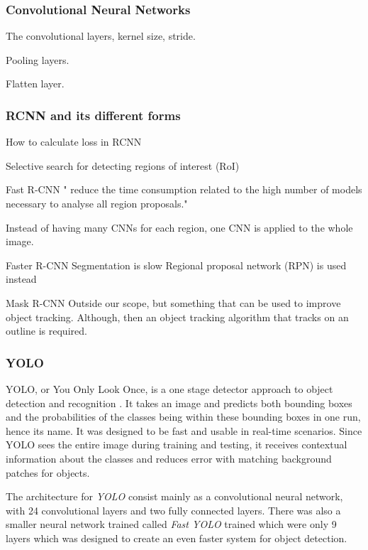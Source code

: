  \subsubsection{Convolutional Neural Networks}
 
 The convolutional layers, kernel size, stride.
 
 Pooling layers.
 
 Flatten layer.

\subsubsection{RCNN and its different forms}

How to calculate loss in RCNN

Selective search for detecting regions of interest (RoI)

Fast R-CNN
" reduce the time consumption related to the high number of models necessary to analyse all region proposals."

Instead of having many CNNs for each region, one CNN is applied to the whole image.

Faster R-CNN
Segmentation is slow
Regional proposal network (RPN) is used instead

Mask R-CNN
Outside our scope, but something that can be used to improve object tracking.
Although, then an object tracking algorithm that tracks on an outline is required.

\subsubsection{YOLO}
YOLO, or You Only Look Once, is a one stage detector approach to object detection and
 recognition \cite{YOLO1}. It takes an image and predicts both bounding boxes and the probabilities of the classes being within these bounding boxes in one run, hence its name. It was designed to be fast and usable in real-time scenarios. Since YOLO sees the entire image during training and testing, it receives contextual information about the classes and reduces error with matching background patches for objects. 
 
 The architecture for \textit{YOLO} consist mainly as a convolutional neural network, with 24 convolutional layers and two fully connected layers. There was also a smaller neural network trained called \textit{Fast YOLO} trained which were only 9 layers which was designed to create an even faster system for object detection. 
 
